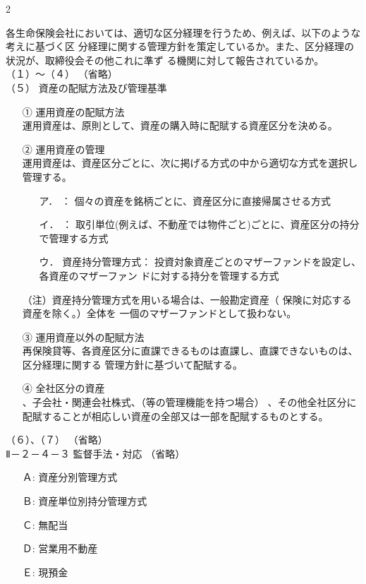 2\documentclass[report,gutter=10mm,fore-edge=10mm,uplatex,dvipdfmx]{jlreq}
\begin{document}
各生命保険会社においては、適切な区分経理を行うため、例えば、以下のような考えに基づく区
分経理に関する管理方針を策定しているか。また、区分経理の状況が、取締役会その他これに準ず
る機関に対して報告されているか。\\
（１）～（４） （省略）\\
（５） 資産の配賦方法及び管理基準
\begin{itemize}
\item[①] 運用資産の配賦方法\\
 運用資産は、原則として、資産の購入時に配賦する資産区分を決める。
\item[②] 運用資産の管理\\
 運用資産は、資産区分ごとに、次に掲げる方式の中から適切な方式を選択し管理する。

\begin{itemize}
\item[ ア．] ： 個々の資産を銘柄ごとに、資産区分に直接帰属させる方式
\item[ イ．] ： 取引単位(例えば、不動産では物件ごと)ごとに、資産区分の持分で管理する方式
\item[ ウ．] 資産持分管理方式： 投資対象資産ごとのマザーファンドを設定し、各資産のマザーファン
 ドに対する持分を管理する方式
\end{itemize} 
（注）資産持分管理方式を用いる場合は、一般勘定資産（ 保険に対応する資産を除く。）全体を 一個のマザーファンドとして扱わない。
\item[③] 運用資産以外の配賦方法\\
 再保険貸等、各資産区分に直課できるものは直課し、直課できないものは、区分経理に関する
 管理方針に基づいて配賦する。
\item[④] 全社区分の資産\\
 、子会社・関連会社株式、（等の管理機能を持つ場合）
 、その他全社区分に配賦することが相応しい資産の全部又は一部を配賦するものとする。
\end{itemize}
\noindent （６）、（７） （省略）\\
Ⅱ－２－４－３ 監督手法・対応 （省略）

\answer{}
\begin{itemize}
\item[ Ａ: ] 資産分別管理方式
\item[ Ｂ: ] 資産単位別持分管理方式
\item[ Ｃ: ] 無配当
\item[ Ｄ: ] 営業用不動産
\item[ Ｅ: ] 現預金
\end{itemize}
\end{document}
